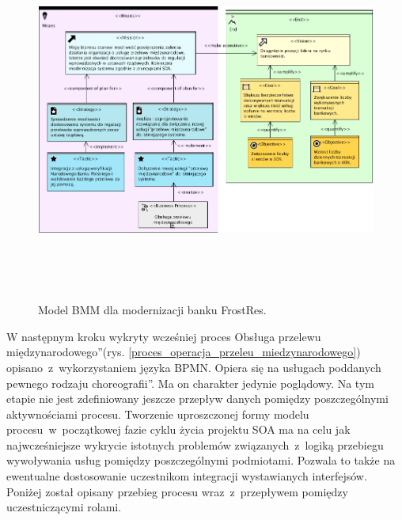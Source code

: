\begin{figure}[h!tbp]
\begin{centering}
\includegraphics[width=16cm, height=12cm]{img/bmm_model_frostres.png}
\caption[Model BMM dla modernizacji banku FrostRes]{Model BMM dla modernizacji banku FrostRes.}\label{BMM_frostres}
\end{centering}
\end{figure}

W następnym kroku wykryty wcześniej proces \quotedblbase Obsługa przelewu międzynarodowego\textquotedblright  (rys. \ref{proces_operacja_przeleu_miedzynarodowego}) opisano~z~wykorzystaniem języka BPMN. Opiera się na usługach poddanych pewnego rodzaju \quotedblbase choreografii\textquotedblright. Ma on charakter jedynie poglądowy. Na tym etapie nie jest zdefiniowany jeszcze przepływ danych pomiędzy poszczególnymi aktywnościami procesu. Tworzenie uproszczonej formy modelu procesu~w~początkowej fazie cyklu życia projektu SOA ma na celu jak najwcześniejsze wykrycie istotnych problemów związanych~z~logiką przebiegu wywoływania usług pomiędzy poszczególnymi podmiotami. Pozwala to także na ewentualne dostosowanie uczestnikom integracji wystawianych interfejsów. Poniżej został opisany przebieg procesu wraz~z~przepływem pomiędzy uczestniczącymi rolami.

